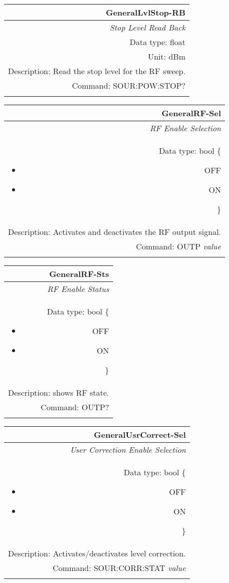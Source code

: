 \documentclass[openany]{article}
\begin{document}
		\begin{tabular}{N}
			\hline
			\bfseries GeneralLvlStop-RB \\ \hline
			\emph{Stop Level Read Back} \\
			Data type: float \\
			Unit: dBm \\
			Description: Read the stop level for the RF sweep. \\
			Command: SOUR:POW:STOP? \\
			\\
			
		\end{tabular}


		\begin{tabular}{N}
			\hline
			\bfseries GeneralRF-Sel \\ \hline
			\emph{RF Enable Selection} \\
			Data type: bool \{\begin{itemize}[noitemsep]
				\small
				\item[] OFF
				\item[] ON
			\end{itemize}\} \\
			Description: Activates and deactivates the RF output signal. \\
			Command: OUTP \emph{value} \\
			\\

		\end{tabular}


		\begin{tabular}{N}
			\hline
			\bfseries GeneralRF-Sts \\ \hline
			\emph{RF Enable Status} \\
			Data type: bool \{\begin{itemize}[noitemsep]
				\small
				\item[] OFF
				\item[] ON
			\end{itemize}\} \\
			Description: shows RF state. \\
			Command: OUTP? \\
			\\

		\end{tabular}

		\begin{tabular}{N}
			\hline
			\bfseries GeneralUsrCorrect-Sel \\ \hline
			\emph{User Correction Enable Selection} \\
			Data type: bool \{\begin{itemize}[noitemsep]
				\small
				\item[] OFF
				\item[] ON
			\end{itemize}\} \\
			Description: Activates/deactivates level correction. \\
			Command: SOUR:CORR:STAT \emph{value} \\
			\\ 

		\end{tabular}
\end{document}

